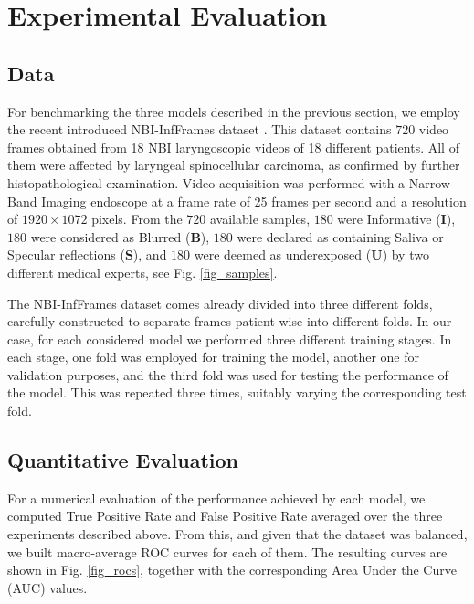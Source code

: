 \section{Experimental Evaluation}
\subsection{Data}
For benchmarking the three models described in the previous section, we employ the recent introduced NBI-InfFrames dataset \cite{moccia_learning-based_2018}.  This dataset contains $720$ video frames obtained from 18 NBI laryngoscopic videos of 18 different patients. All of them were affected by laryngeal spinocellular carcinoma, as confirmed by further histopathological examination. Video acquisition was performed with a Narrow Band Imaging endoscope at a frame rate of 25 frames per second and a resolution of $1920\times1072$ pixels. From the $720 $ available samples, $180$ were Informative (\textbf{I}), $180$ were considered as Blurred (\textbf{B}), $180$ were declared as containing Saliva or Specular reflections (\textbf{S}), and $180$ were deemed as underexposed (\textbf{U}) by two different medical experts, see Fig. \ref{fig_samples}.

The  NBI-InfFrames dataset comes already divided into three different folds, carefully constructed to separate frames patient-wise into different folds. In our case, for each considered model we performed three different training stages. In each stage, one fold was employed for training the model, another one for validation purposes, and the third fold was used for testing the performance of the model. This was repeated three times, suitably varying the corresponding test fold.



\subsection{Quantitative Evaluation}
For a numerical evaluation of the performance achieved by each model, we computed True Positive Rate and False Positive Rate averaged over the three experiments described above. From this, and given that the dataset was balanced, we built macro-average ROC curves for each of them. The resulting curves are shown in Fig. \ref{fig_rocs}, together with the corresponding Area Under the Curve (AUC) values. 



